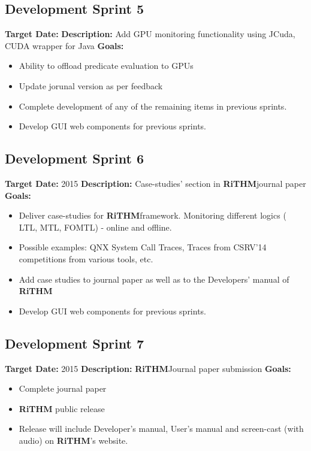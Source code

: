 \documentclass[]{article}
\newcommand{\rithm}{\textbf{RiTHM}\space}
\begin{document}
\subsection{Development Sprint 5}
\textbf{Target Date:}\space {}\newline
\textbf{Description:} Add GPU monitoring functionality using JCuda, CUDA wrapper for Java \newline
\textbf{Goals:}
\begin{itemize}
	\item
	Ability to offload predicate evaluation to GPUs
	\item
	Update jorunal version as per feedback
	\item
	Complete development of any of the remaining items in previous sprints.
	\item
	Develop GUI web components for previous sprints. 
\end{itemize}

\subsection{Development Sprint 6}
\textbf{Target Date:}\space {} {2015}\newline
\textbf{Description:} Case-studies' section in \rithm journal paper \newline
\textbf{Goals:}
\begin{itemize}
	\item
	Deliver case-studies for \rithm framework. Monitoring different logics ( LTL, MTL, FOMTL) - online and offline.
	\item
	Possible examples: QNX System Call Traces, Traces from CSRV'14 competitions from various tools, etc.
	\item
	Add case studies to journal paper as well as to the Developers' manual of \rithm
	\item
	Develop GUI web components for previous sprints. 
\end{itemize}

\subsection{Development Sprint 7}
\textbf{Target Date:}\space {} {2015}\newline
\textbf{Description:} \rithm Journal paper submission \newline
\textbf{Goals:}
\begin{itemize}
	\item
	Complete journal paper
	\item
	\rithm 2.0 public release 
	\item
	Release will include Developer's manual, User's manual and screen-cast (with audio) on \rithm's website.

\end{itemize}
\end{document}
